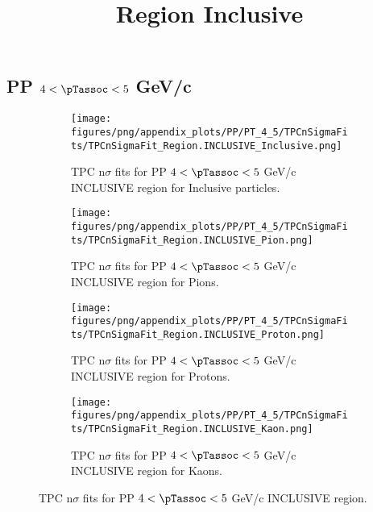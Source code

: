     
            \subsection*{PP $4 < \pTassoc < 5$ GeV/c}
            \begin{figure}[H]
                \title{Region Inclusive}
                \begin{subfigure}[b]{0.5\textwidth}
                    \centering
                    \texttt{[image: figures/png/appendix\_plots/PP/PT\_4\_5/TPCnSigmaFits/TPCnSigmaFit\_Region.INCLUSIVE\_Inclusive.png]}
                    \caption{TPC n$\sigma$ fits for PP $4 < \pTassoc < 5$ GeV/c INCLUSIVE region for Inclusive particles.}
                    \label{fig:appendix_PP_$4 < \pTassoc < 5$ GeV/c_INCLUSIVE_Inclusive}
                \end{subfigure}
                \begin{subfigure}[b]{0.5\textwidth}
                    \centering
                    \texttt{[image: figures/png/appendix\_plots/PP/PT\_4\_5/TPCnSigmaFits/TPCnSigmaFit\_Region.INCLUSIVE\_Pion.png]}
                    \caption{TPC n$\sigma$ fits for PP $4 < \pTassoc < 5$ GeV/c INCLUSIVE region for Pions.}
                    \label{fig:appendix_PP_$4 < \pTassoc < 5$ GeV/c_INCLUSIVE_Pion}
                \end{subfigure}
                \begin{subfigure}[b]{0.5\textwidth}
                    \centering
                    \texttt{[image: figures/png/appendix\_plots/PP/PT\_4\_5/TPCnSigmaFits/TPCnSigmaFit\_Region.INCLUSIVE\_Proton.png]}
                    \caption{TPC n$\sigma$ fits for PP $4 < \pTassoc < 5$ GeV/c INCLUSIVE region for Protons.}
                    \label{fig:appendix_PP_$4 < \pTassoc < 5$ GeV/c_INCLUSIVE_Proton}
                \end{subfigure}
                \begin{subfigure}[b]{0.5\textwidth}
                    \centering
                    \texttt{[image: figures/png/appendix\_plots/PP/PT\_4\_5/TPCnSigmaFits/TPCnSigmaFit\_Region.INCLUSIVE\_Kaon.png]}
                    \caption{TPC n$\sigma$ fits for PP $4 < \pTassoc < 5$ GeV/c INCLUSIVE region for Kaons.}
                    \label{fig:appendix_PP_$4 < \pTassoc < 5$ GeV/c_INCLUSIVE_Kaon}
                \end{subfigure}
                \caption{TPC n$\sigma$ fits for PP $4 < \pTassoc < 5$ GeV/c INCLUSIVE region.}
                \label{fig:appendix_PP_$4 < \pTassoc < 5$ GeV/c_INCLUSIVE}
            \end{figure}
